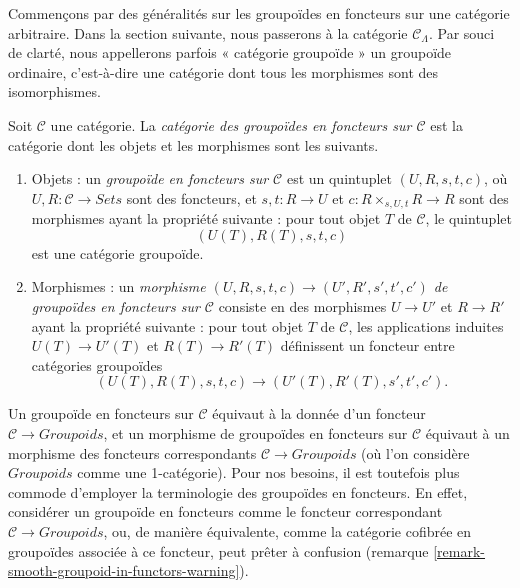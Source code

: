 \noindent
Commençons par des généralités sur les groupoïdes en foncteurs sur une
catégorie arbitraire. Dans la section suivante, nous passerons à la catégorie
$\mathcal{C}_\Lambda$. Par souci de clarté, nous appellerons parfois
« catégorie groupoïde » un groupoïde ordinaire, c'est-à-dire une catégorie
dont tous les morphismes sont des isomorphismes.

\begin{definition}
\label{definition-groupoid-in-functors}
Soit $\mathcal{C}$ une catégorie. La {\it catégorie des groupoïdes en
foncteurs sur $\mathcal{C}$} est la catégorie dont les objets et les morphismes
sont les suivants.
\begin{enumerate}
\item Objets : un {\it groupoïde en foncteurs sur $\mathcal{C}$} est un
quintuplet
$(U, R, s, t, c)$, où $U, R : \mathcal{C} \to \textit{Sets}$ sont des
foncteurs, et $s, t : R \to U$ et $c : R \times_{s, U, t} R \to R$ sont
des morphismes ayant la propriété suivante : pour tout objet $T$ de
$\mathcal{C}$, le quintuplet
$$
(U(T), R(T), s, t, c)
$$
est une catégorie groupoïde.
\item Morphismes : un {\it morphisme
$(U, R, s, t, c) \to (U', R', s', t', c')$ de groupoïdes en foncteurs sur
$\mathcal{C}$} consiste en des morphismes $U \to U'$ et $R \to R'$ ayant la
propriété suivante : pour tout objet $T$ de $\mathcal{C}$, les applications
induites $U(T) \to U'(T)$ et $R(T) \to R'(T)$ définissent un foncteur entre
catégories groupoïdes
$$
(U(T), R(T), s, t, c) \to (U'(T), R'(T), s', t', c').
$$
\end{enumerate}
\end{definition}

\begin{remark}
\label{remark-confusion-groupoids-in-functors}
Un groupoïde en foncteurs sur $\mathcal{C}$ équivaut à la donnée d'un foncteur
$\mathcal{C} \to \textit{Groupoids}$, et un morphisme de groupoïdes en
foncteurs sur $\mathcal{C}$ équivaut à un morphisme des foncteurs
correspondants $\mathcal{C} \to \textit{Groupoids}$ (où l'on considère
$\textit{Groupoids}$ comme une 1-catégorie). Pour nos
besoins, il est toutefois plus commode d'employer la terminologie des
groupoïdes en foncteurs. En effet, considérer un groupoïde en foncteurs comme
le foncteur correspondant $\mathcal{C} \to \textit{Groupoids}$, ou, de manière
équivalente, comme la catégorie cofibrée en groupoïdes associée à ce foncteur,
peut prêter à confusion (remarque
\ref{remark-smooth-groupoid-in-functors-warning}).
\end{remark}

